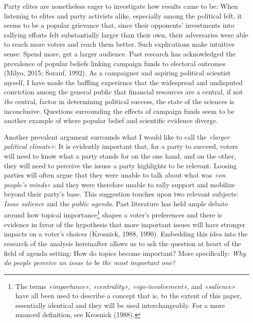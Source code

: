 \documentclass[11pt,a4paper]{article}
\begin{document}
Party elites are nonetheless eager to investigate how results came to be: When listening to elites and party activists alike, especially among the political left, it seems to be a popular grievance that, since their opponents’ investments into rallying efforts felt substantially larger than their own, their adversaries were able to reach more voters and reach them better. Such explications make intuitive sense: Spend more, get a larger audience. Past research has acknowledged the prevalence of popular beliefs linking campaign funds to electoral outcomes (Milyo, 2015; Sorauf, 1992). As a campaigner and aspiring political scientist myself, I have made the baffling experience that the widespread and undisputed conviction among the general public that financial resources are a central, if not \textit{the} central, factor in determining political success, the state of the sciences is inconclusive. Questions surrounding the effects of campaign funds seem to be another example of where popular belief and scientific evidence diverge.

Another prevalent argument surrounds what I would like to call the \textit{«larger political climate»}: It is evidently important that, for a party to succeed, voters will need to know what a party stands for on the one hand, and on the other, they will need to perceive the issues a party highlights to be relevant. Loosing parties will often argue that they were unable to talk about what was \textit{«on people’s minds»} and they were therefore unable to rally support and mobilize beyond their party’s base. This suggestion touches upon two relevant subjects: \textit{Issue salience} and the \textit{public agenda}. Past literature has held ample debate around how topical importance\footnote{The terms \textit{«importance»}, \textit{«centrality»}, \textit{«ego-involvement»}, and \textit{«salience»} have all been used to describe a concept that is, to the extent of this paper, essentially identical and they will be used interchangeably. For a more nuanced definition, see Krosnick (1988).} shapes a voter’s preferences and there is evidence in favor of the hypothesis that more important issues will have stronger impacts on a voter’s choices (Krosnick, 1988, 1990). Embedding this idea into the research of the analysis hereinafter allows us to ask the question at heart of the field of agenda setting: How do topics become important? More specifically: \textit{Why do people perceive an issue to be the most important one?}
\end{document}
